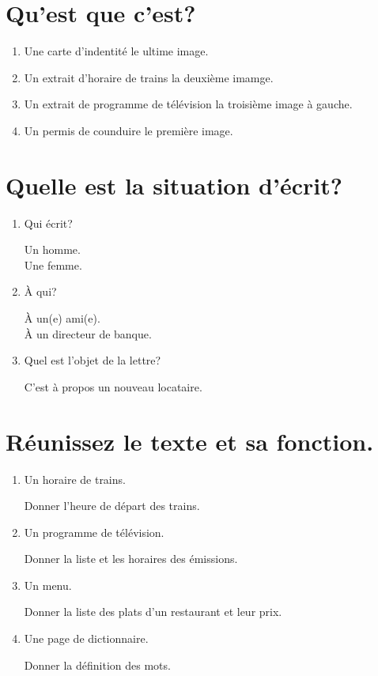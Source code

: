 \section{Qu'est que c'est?}

\begin{enumerate}
    \item Une carte d'indentité \rar le ultime image.
    \item Un extrait d'horaire de trains \rar la deuxième imamge.
    \item Un extrait de programme de télévision \rar la troisième image à gauche.
    \item Un permis de counduire \rar le première image.
\end{enumerate}

\section{Quelle est la situation d'écrit?}

\begin{enumerate}
    \item Qui écrit? \par
         Un homme. \checkmark \\ 
         Une femme.
    \item À qui? \par
         À un(e) ami(e). \checkmark \\ 
         À un directeur de banque.
    \item Quel est l'objet de la lettre? \par 
        \beautifulArrow C'est à propos un nouveau locataire.
\end{enumerate}

\section{Réunissez le texte et sa fonction.}

\begin{enumerate}
    \item Un horaire de trains. \par
        \rar Donner l'heure de départ des trains.
    \item Un programme de télévision. \par
        \rar Donner la liste et les horaires des émissions.
    \item Un menu. \par
        \rar Donner la liste des plats d'un restaurant et leur prix.
    \item Une page de dictionnaire. \par
        \rar Donner la définition des mots.
\end{enumerate}